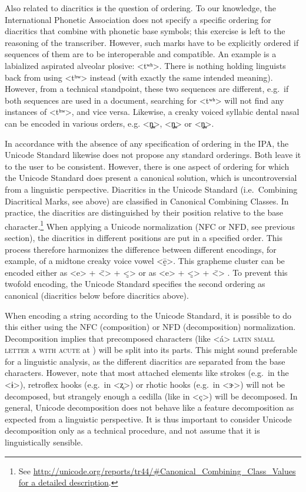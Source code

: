 Also related to diacritics is the question of ordering. To our knowledge, the
International Phonetic Association does not specify a specific ordering for
diacritics that combine with phonetic base symbols; this exercise is left to the
reasoning of the transcriber. However, such marks have to be explicitly ordered
if sequences of them are to be interoperable and compatible. An example is a
labialized aspirated alveolar plosive: <tʷʰ>. There is nothing holding linguists
back from using <tʰʷ> instead (with exactly the same intended meaning). However,
from a technical standpoint, these two sequences are different, e.g.~if both
sequences are used in a document, searching for <tʷʰ> will not find any
instances of <tʰʷ>, and vice versa. Likewise, a creaky voiced syllabic dental
nasal can be encoded in various orders, e.g. <n̪̰̩>, <n̩̰̪> or <n̩̪̰>.

In accordance with the absence of any specification of ordering in the IPA, the
Unicode Standard likewise does not propose any standard orderings. Both leave it
to the user to be consistent. However, there is one aspect of ordering for which
the Unicode Standard does present a canonical solution, which is uncontroversial
from a linguistic perspective. Diacritics in the Unicode Standard
(i.e.~Combining Diacritical Marks, see above) are classified in Canonical
Combining Classes. In practice, the diacritics are distinguished by their
position relative to the base character.\footnote{See
\url{http://unicode.org/reports/tr44/\#Canonical\_Combining\_Class\_Values for a
detailed description}.} When applying a Unicode normalization (NFC or NFD, see
previous section), the diacritics in different positions are put in a specified
order. This process therefore harmonizes the difference between different
encodings, for example, of a midtone creaky voice vowel <ḛ̄>. This grapheme
cluster can be encoded either as <e> + <̄> + <̰> or as <e> + <̰> + <̄> . To
prevent this twofold encoding, the Unicode Standard specifies the second
ordering as canonical (diacritics below before diacritics above).

When encoding a string according to the Unicode Standard, it is possible to do
this either using the NFC (composition) or NFD (decomposition) normalization.
Decomposition implies that precomposed characters (like <á> \textsc{latin small
letter a with acute} at ) will be split into its parts. This might
sound preferable for a linguistic analysis, as the different diacritics are
separated from the base characters. However, note that most attached elements
like strokes (e.g.~in the <ɨ>), retroflex hooks (e.g.~in <ʐ>) or rhotic hooks
(e.g.~in <ɝ>) will not be decomposed, but strangely enough a cedilla (like in
<ç>) will be decomposed. In general, Unicode decomposition does not behave like
a feature decomposition as expected from a linguistic perspective. It is thus
important to consider Unicode decomposition only as a technical procedure, and
not assume that it is linguistically sensible.

